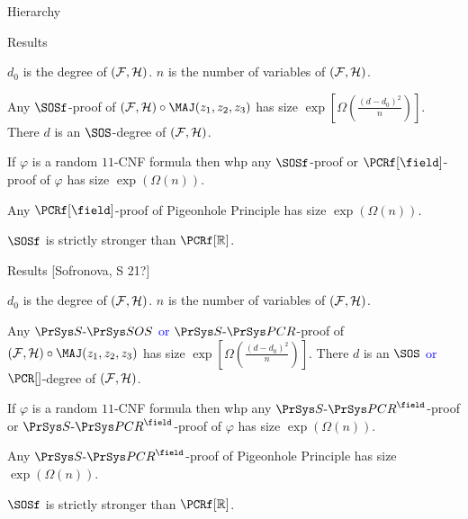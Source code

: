 \begin{frame}{Hierarchy}

    
    
\end{frame}



\begin{frame}{Results}

    $d_0$ is the degree of $(\mathcal{F}, \mathcal{H})$. $n$ is the number of variables of $(\mathcal{F}, \mathcal{H})$.
    
    \begin{theorem}
        Any $\SOSf$-proof of $(\Fs, \Hs) \circ \MAJ(z_1, z_2, z_3)$ has size
        $\exp\left[\Omega\left(\frac{(d - d_0)^2}{n}\right)\right]$. There $d$ is an
        $\SOS$-degree of $(\mathcal{F}, \mathcal{H})$.
    \end{theorem}

    \pause

    \begin{theorem}
        If $\varphi$ is a random $11$-CNF formula then whp any $\SOSf$-proof or $\PCRf[\field]$-proof of
        $\varphi$ has size $\exp(\Omega(n))$.
    \end{theorem}

    \pause
    \begin{theorem}
        Any $\PCRf[\field]$-proof of Pigeonhole Principle has size $\exp(\Omega(n))$.
    \end{theorem}

    $\SOSf$ is strictly stronger than $\PCRf[\mathbb{R}]$.

\end{frame}

\begin{frame}{Results [Sofronova, S 21?]}

    $d_0$ is the degree of $(\mathcal{F}, \mathcal{H})$. $n$ is the number of variables of $(\mathcal{F}, \mathcal{H})$.
    
    \begin{theorem}
        Any \textcolor{blue}{$\SSOS$ or $\SPCR$}-proof of $(\Fs, \Hs) \circ \MAJ(z_1, z_2, z_3)$ has size
        $\exp\left[\Omega\left(\frac{(d - d_0)^2}{n}\right)\right]$. There $d$ is an
        \textcolor{blue}{$\SOS$ or $\PCR[]$}-degree of $(\mathcal{F}, \mathcal{H})$.
    \end{theorem}

    \begin{theorem}
        If $\varphi$ is a random $11$-CNF formula then whp any \textcolor{blue}{$\SPCR^{\field}$}-proof
        or \textcolor{blue}{$\SPCR^{\field}$}-proof of $\varphi$ has size $\exp(\Omega(n))$.
    \end{theorem}

    \begin{theorem}
        Any \textcolor{blue}{$\SPCR^{\field}$}-proof of Pigeonhole Principle has size $\exp(\Omega(n))$.
    \end{theorem}

    $\SOSf$ is strictly stronger than $\PCRf[\mathbb{R}]$.

\end{frame}